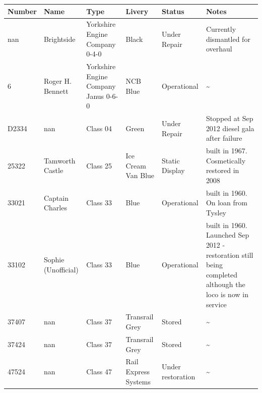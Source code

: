 \documentclass{article}
\begin{document}
\begin{tabular}{llllll}
\toprule
Number & Name & Type & Livery & Status & Notes \\
\midrule
nan & Brightside & Yorkshire Engine Company 0-4-0 & Black & Under Repair & Currently dismantled for overhaul \\
6 & Roger H. Bennett & Yorkshire Engine Company Janus 0-6-0 & NCB Blue & Operational & \textasciitilde{} \\
D2334 & nan & Class 04 & Green & Under Repair & Stopped at Sep 2012 diesel gala after failure \\
25322 & Tamworth Castle & Class 25 & Ice Cream Van Blue & Static Display & built in 1967. Cosmetically restored in 2008 \\
33021 & Captain Charles & Class 33 & Blue & Operational & built in 1960. On loan from Tysley \\
33102 & Sophie (Unofficial) & Class 33 & Blue & Operational & built in 1960. Launched Sep 2012 - restoration still being completed although the loco is now in service \\
37407 & nan & Class 37 & Transrail Grey & Stored & \textasciitilde{} \\
37424 & nan & Class 37 & Transrail Grey & Stored & \textasciitilde{} \\
47524 & nan & Class 47 & Rail Express Systems & Under restoration & \textasciitilde{} \\
\bottomrule
\end{tabular}
\end{document}
